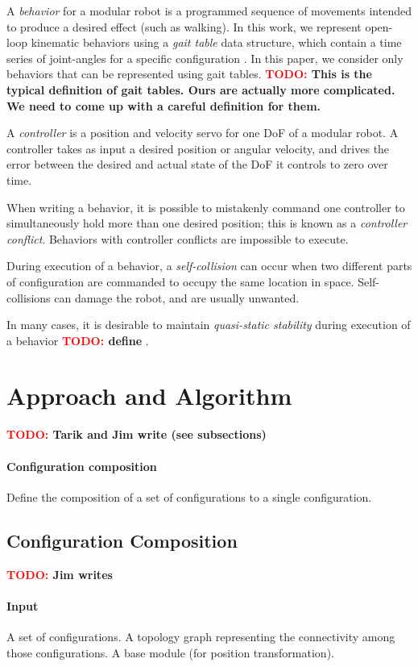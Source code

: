 \documentclass[conference]{IEEEtran}
\newcommand{\TODO}[1]{ {\bf \textcolor{red}{TODO:} #1 }}
\begin{document}
A \textit{behavior} for a modular robot is a programmed sequence of movements intended to produce a desired effect (such as walking). In this work, we represent open-loop kinematic behaviors using a \textit{gait table} data structure, which contain a time series of joint-angles for a specific configuration \cite{yim1994locomotion}.  In this paper, we consider only behaviors that can be represented using gait tables. \TODO{This is the typical definition of gait tables.  Ours are actually more complicated.  We need to come up with a careful definition for them.}

A \textit{controller} is a position and velocity servo for one DoF of a modular robot.  A controller takes as input a desired position or angular velocity, and drives the error between the desired and actual state of the DoF it controls to zero over time.

When writing a behavior, it is possible to mistakenly command one controller to simultaneously hold more than one desired position; this is known as a \textit{controller conflict}.  Behaviors with controller conflicts are impossible to execute.

During execution of a behavior, a \textit{self-collision} can occur when two different parts of configuration are commanded to occupy the same location in space.  Self-collisions can damage the robot, and are usually unwanted.

In many cases, it is desirable to maintain \textit{quasi-static stability} during execution of a behavior \TODO{define}.

\section{Approach and Algorithm}
\TODO{Tarik and Jim write (see subsections)}
\paragraph{Configuration composition}
Define the composition of a set of configurations to a single configuration.

\subsection{Configuration Composition}
\TODO{Jim writes}
\paragraph{Input}
A set of configurations. A topology graph representing the connectivity among those configurations. A base module (for position transformation).
\end{document}
